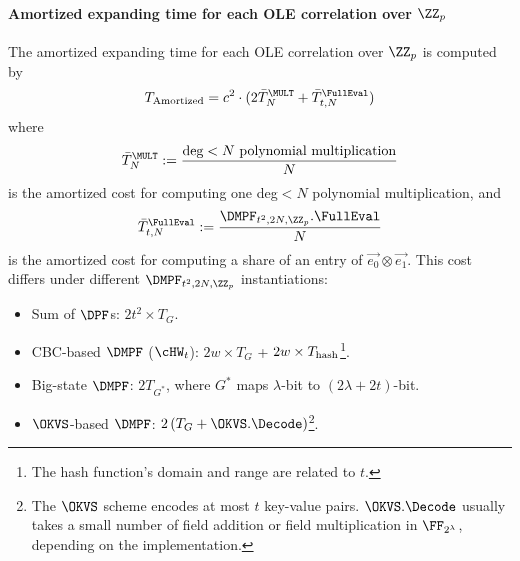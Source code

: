 \paragraph{Amortized expanding time for each OLE correlation over $\ZZ_p$}The amortized expanding time for each OLE correlation over $\ZZ_p$ is computed by 
\[
  T_\text{Amortized} = c^2\cdot(2\bar{T}^\MULT_{N} + \bar{T}^\FullEval_{t,N})
\]
where 
\[
  \bar{T}^\MULT_{N} := \frac{\text{deg}<N\text{ polynomial multiplication}}{N}
\]
is the amortized cost for computing one deg$<N$ polynomial multiplication, and 
\[
  \bar{T}^\FullEval_{t,N}:=\frac{\DMPF_{t^2, 2N, \ZZ_p}.\FullEval}{N}
\]
is the amortized cost for computing a share of an entry of $\vec{e_0}\otimes\vec{e_1}$. This cost differs under different $\DMPF_{t^2, 2N, \ZZ_p}$ instantiations: 
\begin{itemize}
  \item Sum of $\DPF$s: $2t^2\times T_G$.
  \item CBC-based $\DMPF$ ($\cHW_t$): $2w\times T_G$ + $2w\times T_{\rm hash}$\footnote{The hash function's domain and range are related to $t$. }.
  \item Big-state $\DMPF$: $2T_{G^*}$, where $G^*$ maps $\lambda$-bit to $(2\lambda+2t)$-bit. 
  \item $\OKVS$-based $\DMPF$: $2\left(T_G + \OKVS.\Decode\right)$\footnote{The $\OKVS$ scheme encodes at most $t$ key-value pairs. $\OKVS.\Decode$ usually takes a small number of field addition or field multiplication in $\FF_{2^\lambda}$, depending on the implementation. }.
\end{itemize}




